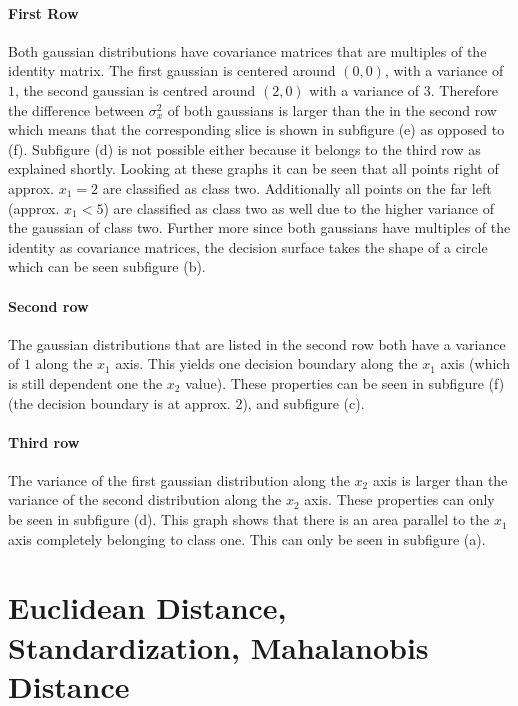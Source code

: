 \documentclass[DIN, pagenumber=false, fontsize=11pt, parskip=half]{scrartcl}
\begin{document}
    \paragraph{First Row}
    Both gaussian distributions have covariance matrices that are multiples of the identity matrix. 
    The first gaussian is centered around $(0,0)$, with a variance of $1$, the second gaussian is centred around $(2,0)$ with a variance of $3$.
    Therefore the difference between $\sigma_x^2$ of both gaussians is larger than the in the second row which means that the corresponding slice
    is shown in subfigure (e) as opposed to (f). Subfigure (d) is not possible either because it belongs to the third row as explained shortly.
    Looking at these graphs it can be seen that all points right of approx. $x_1 = 2$ are classified as class two.
    Additionally all points on the far left (approx. $x_1 < 5$) are classified as class two as well due to the higher variance of the gaussian of class two.
    Further more since both gaussians have multiples of the identity as covariance matrices, the decision surface takes the shape of a circle which can be seen
    subfigure (b).

    \paragraph{Second row}
    The gaussian distributions that are listed in the second row both have a variance of $1$ along the $x_1$ axis. 
    This yields one decision boundary along the $x_1$ axis (which is still dependent one the $x_2$ value).
    These properties can be seen in subfigure (f) (the decision boundary is at approx. $2$), and subfigure (c).

    \paragraph{Third row}
    The variance of the first gaussian distribution along the $x_2$ axis is larger than the variance of the second distribution along the $x_2$ axis.
    These properties can only be seen in subfigure (d). This graph shows that there is an area parallel to the $x_1$ axis completely belonging to class one.
    This can only be seen in subfigure (a).

    \section{Euclidean Distance, Standardization, Mahalanobis Distance}
\end{document}
